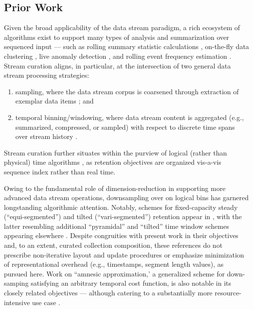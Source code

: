 \subsection{Prior Work}

Given the broad applicability of the data stream paradigm, a rich ecosystem of algorithms exist to support many types of analysis and summarization over sequenced input --- such as rolling summary statistic calculations \citep{lin2004continuously}, on-the-fly data clustering \citep{silva2013data}, live anomaly detection \citep{cai2004maids}, and rolling event frequency estimation \citep{manku2002approximate}.
Stream curation aligns, in particular, at the intersection of two general data stream processing strategies:
\begin{enumerate}
\item sampling, where the data stream corpus is coarsened through extraction of exemplar data items \citep{sibai2016sampling}; and
\item temporal binning/windowing, where data stream content is aggregated (e.g., summarized, compressed, or sampled) with respect to discrete time spans over stream history \citep{gama2007data}.
\end{enumerate}
Stream curation further situates within the purview of logical (rather than physical) time algorithms \citep{sibai2016sampling}, as retention objectives are organized vis-a-vis sequence index rather than real time.

Owing to the fundamental role of dimension-reduction in supporting more advanced data stream operations, downsampling over on logical bins has garnered longstanding algorithmic attention.
Notably, schemes for fixed-capacity steady (``equi-segmented'') and tilted (``vari-segmented'') retention appear in \citep{zhao2005generalized}, with the latter resembling additional ``pyramidal'' and ``tilted'' time window schemes appearing elsewhere \citep{aggarwal2003framework,han2005stream}.
Despite congruities with present work in their objectives and, to an extent, curated collection composition, these references do not prescribe non-iterative layout and update procedures or emphasize minimization of representational overhead (e.g., timestamps, segment length values), as pursued here.
Work on ``amnesic approximation,' a generalized scheme for down-samping satisfying an arbitrary temporal cost function, is also notable in its closely related objectives --- although catering to a substantially more resource-intensive use case \cite{palpanas2004online}.

